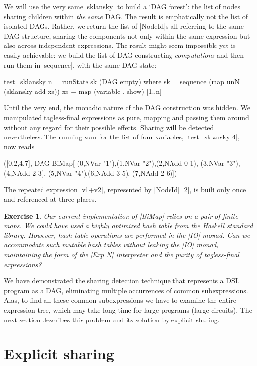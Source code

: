 \documentclass[submission,copyright,creativecommons]{eptcs}
\newtheorem{Exercise}{Exercise} \newcommand\aside[1]{}
\begin{document}
We will use the very same |sklansky| to build a `DAG
forest': the list of nodes sharing children within \emph{the same}
DAG. The result is emphatically not the list of isolated
DAGs. Rather, we return the list of |NodeId|s all referring to the
same DAG structure, sharing the components not only within the same
expression but also across independent expressions. The result might
seem impossible yet is easily achievable: we build the list of
DAG-constructing \emph{computations} and then run them in
|sequence|, with the same DAG state:
\begin{code}
test_sklansky n = runState sk (DAG empty)
  where
  sk = sequence (map unN (sklansky add xs))
  xs = map (variable . show) [1..n]
\end{code}
Until the very end, the monadic nature of the DAG construction was
hidden. We manipulated tagless-final expressions as pure, mapping and
passing them around without any regard for their possible effects.
Sharing will be detected nevertheless. The running sum for the list
of four variables, |test_sklansky 4|, now reads
\begin{code}
([0,2,4,7],
  DAG BiMap[
    (0,NVar "1"),(1,NVar "2"),(2,NAdd 0 1),
    (3,NVar "3"),(4,NAdd 2 3),
    (5,NVar "4"),(6,NAdd 3 5),
    (7,NAdd 2 6)])
\end{code}
The repeated expression |v1+v2|, represented by |NodeId|
|2|, is built only once and referenced at three places.

\begin{Exercise}
Our current implementation of |BiMap| relies on a pair of finite maps. We
could have used a highly optimized hash table from the Haskell standard
library. However, hash table operations are performed in the |IO|
monad. Can we accommodate such mutable hash tables without leaking the
|IO| monad, maintaining the form of the |Exp N| interpreter and the
purity of tagless-final expressions?
\end{Exercise}

We have demonstrated the sharing detection technique that represents
a DSL program as a DAG, eliminating multiple occurrences of common
subexpressions. Alas, to find all these common subexpressions we have
to examine the entire expression tree, which may take long time for large
programs (large circuits). The next section describes this problem 
and its solution by explicit sharing.

\section{Explicit sharing}
\label{s:obj-let}
\end{document}
